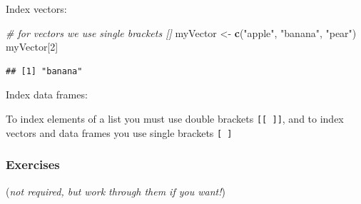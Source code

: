 \documentclass[
]{book}
\newenvironment{Shaded}{\begin{snugshade}}{\end{snugshade}}
\newcommand{\CommentTok}[1]{\textcolor[rgb]{0.56,0.35,0.01}{\textit{#1}}}
\newcommand{\DecValTok}[1]{\textcolor[rgb]{0.00,0.00,0.81}{#1}}
\newcommand{\FunctionTok}[1]{\textcolor[rgb]{0.13,0.29,0.53}{\textbf{#1}}}
\newcommand{\NormalTok}[1]{#1}
\newcommand{\OtherTok}[1]{\textcolor[rgb]{0.56,0.35,0.01}{#1}}
\newcommand{\SpecialCharTok}[1]{\textcolor[rgb]{0.81,0.36,0.00}{\textbf{#1}}}
\newcommand{\StringTok}[1]{\textcolor[rgb]{0.31,0.60,0.02}{#1}}
\begin{document}
Index vectors:

\begin{Shaded}
\begin{Highlighting}[]
\CommentTok{\# for vectors we use single brackets []}
\NormalTok{myVector }\OtherTok{\textless{}{-}} \FunctionTok{c}\NormalTok{(}\StringTok{"apple"}\NormalTok{, }\StringTok{"banana"}\NormalTok{, }\StringTok{"pear"}\NormalTok{)}
\NormalTok{myVector[}\DecValTok{2}\NormalTok{]}
\end{Highlighting}
\end{Shaded}

\begin{verbatim}
## [1] "banana"
\end{verbatim}

Index data frames:

\begin{Shaded}
\end{Shaded}

To index elements of a list you must use double brackets \texttt{{[}{[}\ {]}{]}}, and to index vectors and data frames you use single brackets \texttt{{[}\ {]}}

\hypertarget{exercises}{%
\subsubsection{Exercises}\label{exercises}}

(\emph{not required, but work through them if you want!})
\end{document}
